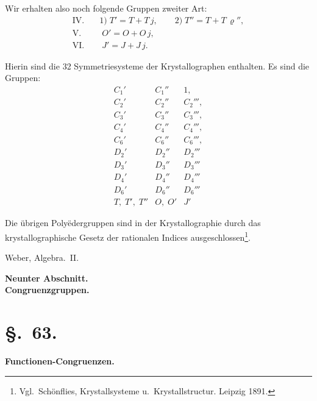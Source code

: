 \documentclass[12pt,a4paper]{article}
\newcommand{\sect}[1]{\section*{{\S.~#1.}}\addcontentsline{toc}{section}{\S.~#1}}
\begin{document}
Wir erhalten also noch folgende Gruppen zweiter Art:
\[
\begin{aligned}
\text{IV.}\quad &\text{1)}\; T' = T + T\,j,\qquad \text{2)}\; T'' = T + T\,\varrho'',\\
\text{V.}\quad &\; O' = O + O\,j,\\
\text{VI.}\quad &\; J' = J + J\,j.
\end{aligned}
\]

\newpage
{}

Hierin sind die 32 Symmetriesysteme der Krystallographen enthalten. Es sind die Gruppen:
\[
\begin{array}{lll}
C_{1}' & C_{1}'' & 1,\\
C_{2}' & C_{2}'' & C_{2}''',\\
C_{3}' & C_{3}'' & C_{3}''',\\
C_{4}' & C_{4}'' & C_{4}''',\\
C_{6}' & C_{6}'' & C_{6}''',\\
D_{2}' & D_{2}'' & D_{2}'''\\
D_{3}' & D_{3}'' & D_{3}'''\\
D_{4}' & D_{4}'' & D_{4}'''\\
D_{6}' & D_{6}'' & D_{6}'''\\
T,\; T',\; T'' & O,\; O' & J'
\end{array}
\]

Die übrigen Polyëdergruppen sind in der Krystallographie durch das krystallographische Gesetz der rationalen Indices ausgeschlossen\footnote{Vgl.~Schönflies, Krystallsysteme u.~Krystallstructur. Leipzig 1891.}.

\begin{flushright}
Weber, Algebra.~II.
\end{flushright}



\newpage
\begin{center}
\Large\textbf{Neunter Abschnitt.}\\[4pt]
\Large\textbf{Congruenzgruppen.}
\end{center}
\label{sec:neunter}
\thispagestyle{fancy}

\sect{63}
\begin{center}
\textbf{Functionen-Congruenzen.}
\end{center}
\label{sec:63}
\end{document}
